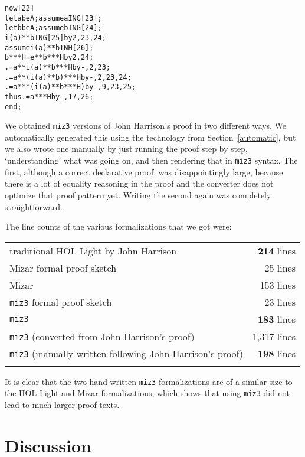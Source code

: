 \documentclass{LMCS}
\let\xmedskip=\medskip
\begin{document}
\xmedskip
\begin{alltt}\small
now [22]
  let a be A; assume a IN G [23];
  let b be A; assume b IN G [24];
  i(a)**b IN G [25] by 2,23,24;
  assume i(a)**b IN H [26];
  b***H = e**b***H by 2,24;
    .= a**i(a)**b***H by -,2,23;
    .= a**(i(a)**b)***H by -,2,23,24;
    .= a***(i(a)**b***H) by -,9,23,25;
  thus .= a***H by -,17,26;
end;
\end{alltt}
\xmedskip

\noindent
We obtained \texttt{miz3} versions of John Harrison's proof in two
different ways.
We automatically generated this using the technology from Section~\ref{automatic},
but we also wrote one manually by just running the proof step by step, `understanding' what was going on, and then rendering that in \texttt{miz3} syntax.
The first, although a correct declarative proof, was disappointingly large,
because there is a lot of equality reasoning in the proof and the
converter does not optimize that proof pattern yet.
Writing the second again was completely straightforward.

The line counts of the various formalizations that we got were:
\xmedskip
\begin{center}
\begin{tabular}{lr}
\hline
\noalign{\smallskip}
traditional HOL Light by John Harrison & \textbf{214} lines \\
\noalign{\smallskip}
\hline
\noalign{\smallskip}
Mizar formal proof sketch & 25 lines \\
Mizar & 153 lines \\
\texttt{miz3} formal proof sketch & 23 lines \\
\texttt{miz3} & \textbf{183} lines \\
\noalign{\smallskip}
\hline
\noalign{\smallskip}
\texttt{miz3} (converted from John Harrison's proof) & 1,317 lines \\
\texttt{miz3} (manually written following John Harrison's proof) & \textbf{198} lines \\
\noalign{\smallskip}
\hline
\end{tabular}\label{proofcounts}
\end{center}
\xmedskip

\noindent
It is clear that the two hand-written \texttt{miz3} formalizations are of a
similar size to the HOL Light and Mizar formalizations, which shows that
using \texttt{miz3} did not lead to much larger proof texts.


\section{Discussion}\label{discussion}
\end{document}
